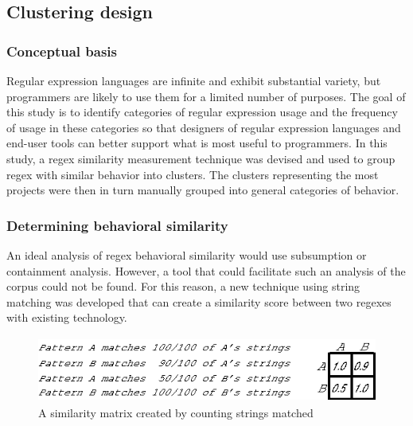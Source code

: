 \subsection{Clustering design}
\label{sec:clusteringDesign}

\subsubsection{Conceptual basis}
Regular expression languages are infinite and exhibit substantial variety, but programmers are likely to use them for a limited number of purposes.  The goal of this study is to identify categories of regular expression usage and the frequency of usage in these categories so that designers of regular expression languages and end-user tools can better support what is most useful to programmers.  In this study, a regex similarity measurement technique was devised and used to group regex with similar behavior into clusters.  The clusters representing the most projects were then in turn manually grouped into general categories of behavior.


\subsubsection{Determining behavioral similarity}
An ideal analysis of regex behavioral similarity would use subsumption or containment analysis. However, a tool that could facilitate such an analysis of the corpus could not be found.  For this reason, a new technique using string matching was developed that can create a similarity score between two regexes with existing technology.

\begin{figure}[tb]
\centering
\includegraphics[height=0.85in]{nontex/illustrations/minimalMatrix.eps}
\caption{A similarity matrix created by counting strings matched}
\label{fig:minimalMatrix}
\end{figure}

